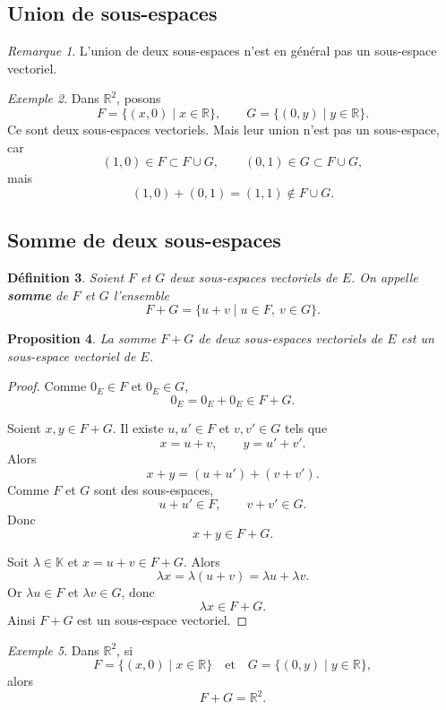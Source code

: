 \documentclass[11pt,a4paper]{article}
\newtheorem{definition}{Définition}[section]
\newtheorem{proposition}[definition]{Proposition}
\theoremstyle{remark}
\newtheorem{remarque}[definition]{Remarque}
\newtheorem{exemple}[definition]{Exemple}
\newcommand{\R}{\mathbb{R}}
\newcommand{\K}{\mathbb{K}}
\begin{document}
\subsection{Union de sous-espaces}

\begin{remarque}
L’union de deux sous-espaces n’est en général pas un sous-espace vectoriel.
\end{remarque}

\begin{exemple}
Dans \(\R^2\), posons
\[
F=\{(x,0)\mid x\in\R\},
\qquad
G=\{(0,y)\mid y\in\R\}.
\]
Ce sont deux sous-espaces vectoriels. Mais leur union n’est pas un sous-espace, car
\[
(1,0)\in F\subset F\cup G,
\qquad
(0,1)\in G\subset F\cup G,
\]
mais
\[
(1,0)+(0,1)=(1,1)\notin F\cup G.
\]
\end{exemple}

\subsection{Somme de deux sous-espaces}

\begin{definition}
Soient \(F\) et \(G\) deux sous-espaces vectoriels de \(E\). On appelle \textbf{somme} de \(F\) et \(G\) l’ensemble
\[
F+G=\{u+v\mid u\in F,\ v\in G\}.
\]
\end{definition}

\begin{proposition}
La somme \(F+G\) de deux sous-espaces vectoriels de \(E\) est un sous-espace vectoriel de \(E\).
\end{proposition}

\begin{proof}
Comme \(0_E\in F\) et \(0_E\in G\),
\[
0_E=0_E+0_E\in F+G.
\]

Soient \(x,y\in F+G\). Il existe \(u,u'\in F\) et \(v,v'\in G\) tels que
\[
x=u+v,\qquad y=u'+v'.
\]
Alors
\[
x+y=(u+u')+(v+v').
\]
Comme \(F\) et \(G\) sont des sous-espaces,
\[
u+u'\in F,\qquad v+v'\in G.
\]
Donc
\[
x+y\in F+G.
\]

Soit \(\lambda\in\K\) et \(x=u+v\in F+G\). Alors
\[
\lambda x=\lambda(u+v)=\lambda u+\lambda v.
\]
Or \(\lambda u\in F\) et \(\lambda v\in G\), donc
\[
\lambda x\in F+G.
\]
Ainsi \(F+G\) est un sous-espace vectoriel.
\end{proof}

\begin{exemple}
Dans \(\R^2\), si
\[
F=\{(x,0)\mid x\in\R\}
\quad \text{et} \quad
G=\{(0,y)\mid y\in\R\},
\]
alors
\[
F+G=\R^2.
\]
\end{exemple}
\end{document}
